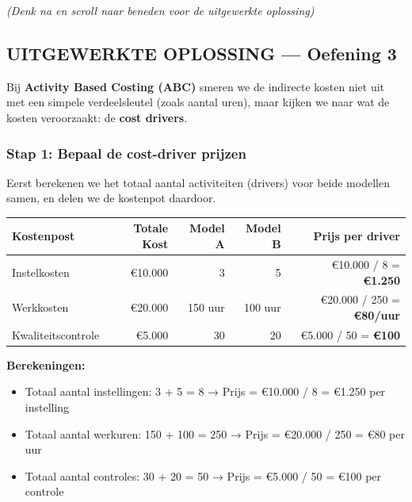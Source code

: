 \documentclass[a4paper,11pt]{article}
\begin{document}
\begin{oefenblok}
    \vspace{0.3cm}
    \textit{(Denk na en scroll naar beneden voor de uitgewerkte oplossing)}


    \subsection*{UITGEWERKTE OPLOSSING — Oefening 3}

    Bij \textbf{Activity Based Costing (ABC)} smeren we de
    indirecte kosten niet uit met een simpele verdeelsleutel (zoals aantal uren), maar kijken we naar wat de kosten veroorzaakt: de \textbf{cost drivers}.

    \subsubsection*{Stap 1: Bepaal de cost-driver prijzen}

    Eerst berekenen we het totaal aantal activiteiten (drivers) voor beide modellen samen, en delen we de kostenpot daardoor.

    \begin{center}
        \begin{tabular}{|l|r|r|r|r|}
            \hline
            \textbf{Kostenpost} & \textbf{Totale Kost} & \textbf{Model A} & \textbf{Model B} & \textbf{Prijs per driver}        \\
            \hline
            Instelkosten        & €10.000              & 3                & 5                & €10.000 / 8 = \textbf{€1.250}    \\
            \hline
            Werkkosten          & €20.000              & 150 uur          & 100 uur          & €20.000 / 250 = \textbf{€80/uur} \\
            \hline
            Kwaliteitscontrole  & €5.000               & 30               & 20               & €5.000 / 50 = \textbf{€100}      \\
            \hline
        \end{tabular}
    \end{center}

    \textbf{Berekeningen:}
    \begin{itemize}
        \item Totaal aantal instellingen: 3 + 5 = 8 → Prijs = €10.000 / 8 = €1.250 per instelling
        \item Totaal aantal werkuren: 150 + 100 = 250 → Prijs = €20.000 / 250 = €80 per uur
        \item Totaal aantal controles: 30 + 20 = 50 → Prijs = €5.000 / 50 = €100 per controle
    \end{itemize}


\end{oefenblok}
\end{document}

